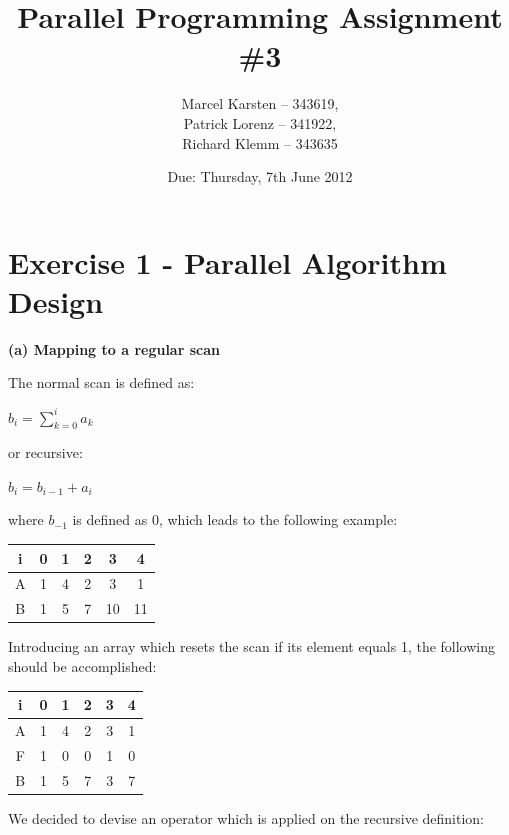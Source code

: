 \documentclass[a4paper,twoside,11pt]{article}
\begin{document}
\pagestyle{fancyplain}

\title{Parallel Programming Assignment \#3} 
\author{Marcel Karsten -- 343619,\\ Patrick Lorenz -- 341922,\\ Richard Klemm -- 343635 }
\date{Due: Thursday, 7th June 2012} %
\maketitle

\lhead{}
\renewcommand{\headrulewidth}{0px}



\section{Exercise 1 - Parallel Algorithm Design}

\textbf{(a) Mapping to a regular scan}

The normal scan is defined as:

$b_i = \sum\limits_{k=0}^{i}a_k$

or recursive:

$b_i = b_{i-1} + a_i$

where $b_{-1}$ is defined as 0, which leads to the following example:

\begin{tabular}{|c|c|c|c|c|c|}
\hline
i&0&1&2&3&4\\
\hline
A&1& 4&2&3&1\\
\hline
B&1&5&7&10&11\\
\hline
\end{tabular}

Introducing an array which resets the scan if its element equals 1, the following should be accomplished:


\begin{tabular}{|c|c|c|c|c|c|}
\hline
i&0&1&2&3&4\\
\hline
A&1& 4&2&3&1\\
\hline
F&1& 0&0&1&0\\
\hline
B&1&5&7&3&7\\
\hline
\end{tabular}

We decided to devise an operator which is applied on the recursive definition:
\end{document}
